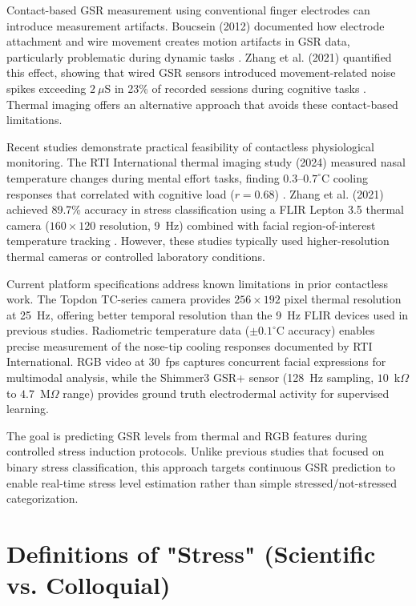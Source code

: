 \documentclass{report}
\begin{document}
Contact-based GSR measurement using conventional finger electrodes can introduce measurement artifacts. Boucsein (2012) documented how electrode attachment and wire movement creates motion artifacts in GSR data, particularly problematic during dynamic tasks \cite{boucsein2012}. Zhang et al. (2021) quantified this effect, showing that wired GSR sensors introduced movement-related noise spikes exceeding $2~\mu$S in 23\% of recorded sessions during cognitive tasks \cite{zhang2021}. Thermal imaging offers an alternative approach that avoids these contact-based limitations.

Recent studies demonstrate practical feasibility of contactless physiological monitoring. The RTI International thermal imaging study (2024) measured nasal temperature changes during mental effort tasks, finding $0.3$--$0.7^{\circ}$C cooling responses that correlated with cognitive load ($r = 0.68$) \cite{rti2024}. Zhang et al. (2021) achieved 89.7\% accuracy in stress classification using a FLIR Lepton 3.5 thermal camera ($160 \times 120$ resolution, 9~Hz) combined with facial region-of-interest temperature tracking \cite{zhang2021}. However, these studies typically used higher-resolution thermal cameras or controlled laboratory conditions.

Current platform specifications address known limitations in prior contactless work. The Topdon TC-series camera provides $256 \times 192$ pixel thermal resolution at 25~Hz, offering better temporal resolution than the 9~Hz FLIR devices used in previous studies. Radiometric temperature data ($\pm 0.1^{\circ}$C accuracy) enables precise measurement of the nose-tip cooling responses documented by RTI International. RGB video at 30~fps captures concurrent facial expressions for multimodal analysis, while the Shimmer3 GSR+ sensor (128~Hz sampling, $10$~k$\Omega$ to $4.7$~M$\Omega$ range) provides ground truth electrodermal activity for supervised learning.

The goal is predicting GSR levels from thermal and RGB features during controlled stress induction protocols. Unlike previous studies that focused on binary stress classification, this approach targets continuous GSR prediction to enable real-time stress level estimation rather than simple stressed/not-stressed categorization.


\section{Definitions of "Stress" (Scientific vs. Colloquial)}
\label{sec:stress_definitions}
\end{document}
